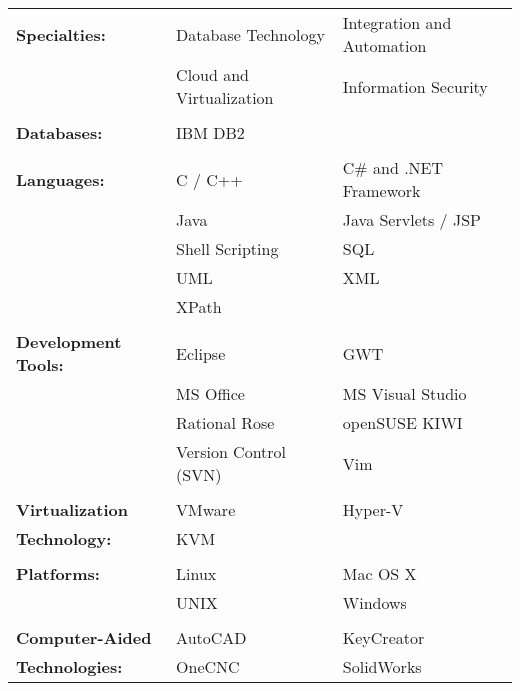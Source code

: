 \documentclass[margin,line]{resume}
\begin{document}
\begin{resume}
\begin{tabular}{@{}p{1.75in}p{1.75in}p{1.75in}}
\textbf{Specialties:}			&	Database Technology		&	Integration and Automation	\\
					&	Cloud and Virtualization	&	Information Security		\\
\\
\textbf{Databases:}			&	IBM DB2				&					\\
\\
\textbf{Languages:}			&	C / C++				&	C\# and .NET Framework		\\
					&	Java				&	Java Servlets / JSP		\\
					&	Shell Scripting			&	SQL				\\
					&	UML				&	XML				\\
					&	XPath				&					\\
\\
\textbf{Development Tools:}		&	Eclipse				&	GWT				\\
					&	MS Office			&	MS Visual Studio		\\
					&	Rational Rose			&	openSUSE KIWI			\\
					&	Version Control (SVN)		&	Vim				\\
\\
\textbf{Virtualization }		&	VMware				&	Hyper-V				\\
\textbf{Technology:}			&	KVM				&					\\
\\
\textbf{Platforms:}			&	Linux				&	Mac OS X			\\
					&	UNIX				&	Windows				\\
\\
\textbf{Computer-Aided }		&	AutoCAD				&	KeyCreator			\\
\textbf{Technologies:}			&	OneCNC				&	SolidWorks			\\
\end{tabular}

%

\end{resume}
\end{document}
